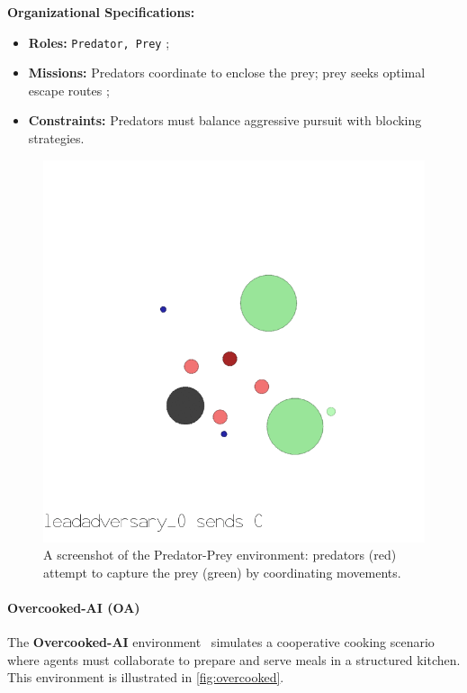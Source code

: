 \documentclass[journal]{IEEEtai}
\begin{document}
\textbf{Organizational Specifications:} 
\begin{itemize}
    \item \textbf{Roles:} \texttt{Predator, Prey} ;
    \item \textbf{Missions:} Predators coordinate to enclose the prey; prey seeks optimal escape routes ;
    \item \textbf{Constraints:} Predators must balance aggressive pursuit with blocking strategies.
\end{itemize}

\begin{figure}[h!]
    \centering
    \includegraphics[width=0.7\linewidth]{figures/predator_prey.png}
    \caption{A screenshot of the Predator-Prey environment: predators (red) attempt to capture the prey (green) by coordinating movements.}
    \label{fig:predator_prey}
\end{figure}

\paragraph{Overcooked-AI (OA)}
The \textbf{Overcooked-AI} environment~\cite{overcookedai} simulates a cooperative cooking scenario where agents must collaborate to prepare and serve meals in a structured kitchen. This environment is illustrated in \autoref{fig:overcooked}.
\end{document}
